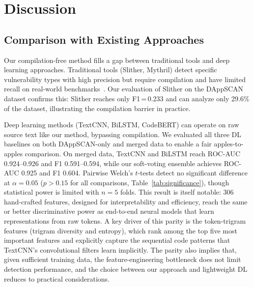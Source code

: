 \documentclass[11pt,a4paper]{article}
\begin{document}
\section{Discussion}
\label{sec:discussion}

\subsection{Comparison with Existing Approaches}

Our compilation-free method fills a gap between traditional tools and deep learning approaches.
Traditional tools (Slither, Mythril) detect specific vulnerability types with high precision but require compilation and have limited recall on real-world benchmarks~\cite{durieux2020empirical,ghaleb2020effective,wu2023dappscan}.
Our evaluation of Slither on the DAppSCAN dataset confirms this: Slither reaches only F1\,=\,0.233 and can analyze only 29.6\% of the dataset, illustrating the compilation barrier in practice.

Deep learning methods (TextCNN, BiLSTM, CodeBERT) can operate on raw source text like our method, bypassing compilation.
We evaluated all three DL baselines on both DAppSCAN-only and merged data to enable a fair apples-to-apples comparison.
On merged data, TextCNN and BiLSTM reach ROC-AUC 0.924--0.926 and F1 0.591--0.594, while our soft-voting ensemble achieves ROC-AUC 0.925 and F1 0.604.
Pairwise Welch's $t$-tests detect no significant difference at $\alpha = 0.05$ ($p > 0.15$ for all comparisons, Table~\ref{tab:significance}), though statistical power is limited with $n = 5$ folds.
This result is itself notable: 306 hand-crafted features, designed for interpretability and efficiency, reach the same or better discriminative power as end-to-end neural models that learn representations from raw tokens.
A key driver of this parity is the token-trigram features (trigram diversity and entropy), which rank among the top five most important features and explicitly capture the sequential code patterns that TextCNN's convolutional filters learn implicitly.
The parity also implies that, given sufficient training data, the feature-engineering bottleneck does not limit detection performance, and the choice between our approach and lightweight DL reduces to practical considerations.
\end{document}
